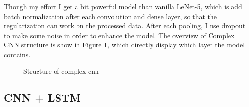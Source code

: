 \documentclass{article}
\begin{document}
Though my effort I get a bit powerful model than vanilla LeNet-5, which is add batch normalization after each convolution and dense layer, so that the regularization can work on the processed data. After each pooling, I use dropout to make some noise in order to enhance the model. The overview of Complex CNN structure is show in Figure \ref{Complex CNN}, which directly display which layer the model contains.
 
\begin{figure}
	\centering
	\caption{Structure of complex-cnn}
	\label{Complex CNN}
\end{figure} 




\subsection{CNN + LSTM}
\end{document}
